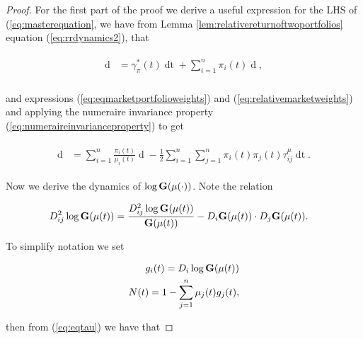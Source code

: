\documentclass[british]{amsart} \usepackage{lmodern}
\numberwithin{equation}{section} \numberwithin{figure}{section}
\theoremstyle{plain} \newtheorem{thm}{\protect\theoremname}[section]
\theoremstyle{definition} \newtheorem{defn}[thm]{\protect\definitionname}
\theoremstyle{plain} \newtheorem{assumption}[thm]{\protect\assumptionname}
\theoremstyle{plain} \newtheorem{lem}[thm]{\protect\lemmaname}
\theoremstyle{plain} \newtheorem{prop}[thm]{\protect\propositionname}
\theoremstyle{remark} \newtheorem{rem}[thm]{\protect\remarkname}
\theoremstyle{plain} \newtheorem{cor}[thm]{\protect\corollaryname}
\renewcommand{\d}[1]{\mathop{\mathrm{d}{#1}}}
\begin{document}
\begin{proof}

For the first part of the proof we derive a useful expression for the LHS of
(\ref{eq:masterequation}, we have from Lemma
\ref{lem:relativereturnoftwoportfolios} equation (\ref{eq:rrdynamics2}), that

  \begin{gather} 
    \begin{split} 
      \d{ \log{ \left( \frac{V^{\pi}(t) }{ V^{\mu}(t) } \right) } } 
        &= \gamma_{\pi}^{*}(t)\d{t} + 
            \sum_{i=1}^{n} \pi_{i}(t)  \d{ \log{\mu_{i}(t)} }, \\ 
    \end{split} 
  \end{gather}

  and expressions (\ref{eq:eqmarketportfolioweights}) and (\ref{eq:relativemarketweights})
  and applying the numeraire invariance property
  (\ref{eq:numeraireinvarianceproperty}) to get
    
  \begin{gather} 
    \label{eq:masterstep1}
    \begin{split} 
      \d{ \log{ \left( \frac{V^{\pi}(t) }{ V^{\mu}(t) } \right) } } 
        &= 
            \sum_{i=1}^{n} \frac{\pi_{i}(t)}{\mu_{i}(t)} \d{\mu_{i}(t)} 
            - \frac{1}{2} \sum_{i=1}^{n} \sum_{j=1}^{n} 
            \pi_{i}(t)\pi_{j}(t)\tau_{ij}^{\mu}\d{t}.
    \end{split} 
  \end{gather}

  Now we derive the dynamics of $\log{\mathbf{G}(\mu(\cdot))}$. Note the relation

  \begin{gather} 
    \begin{split} 
      D_{ij}^2\log{\mathbf{G}(\mu(t))} &= \frac{D_{ij}^2\log{\mathbf{G}(\mu(t))}}{\mathbf{G}(\mu(t))} - D_{i}\mathbf{G}(\mu(t)) \cdot D_{j}\mathbf{G}(\mu(t)).
    \end{split} 
  \end{gather}

  To simplify notation we set

  \begin{gather} 
    \begin{split} 
        g_{i}(t) = D_{i}\log{\mathbf{G}(\mu(t))} \\
        N(t) = 1 - \sum_{j=1}^{n} \mu_{j}(t)g_{j}(t),
    \end{split} 
  \end{gather}

then from (\ref{eq:eqtau}) we have that
 

\end{proof}
\end{document}
